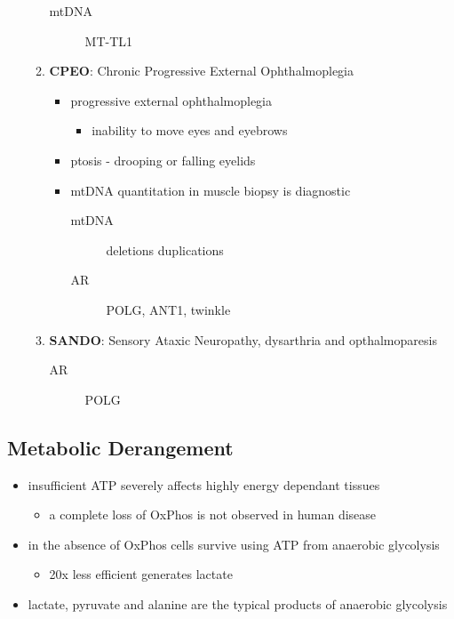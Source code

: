 \documentclass[12pt]{scrartcl}
\begin{document}
\begin{enumerate}
\begin{enumerate}
\label{sec:org7aaee90}
\begin{description}
\item[{mtDNA}] MT-TL1
\end{description}
\item \textbf{CPEO}: Chronic Progressive External Ophthalmoplegia
\label{sec:orga983291}
\begin{itemize}
\item progressive external ophthalmoplegia
\begin{itemize}
\item inability to move eyes and eyebrows
\end{itemize}
\item ptosis - drooping or falling eyelids
\item mtDNA quantitation in muscle biopsy is diagnostic
\begin{description}
\item[{mtDNA}] deletions \textpm{} duplications
\item[{AR}] POLG, ANT1, twinkle
\end{description}
\end{itemize}

\item \textbf{SANDO}: Sensory Ataxic Neuropathy, dysarthria and opthalmoparesis
\label{sec:orgbb9296c}
\begin{description}
\item[{AR}] POLG
\end{description}
\end{enumerate}
\end{enumerate}

\subsection{Metabolic Derangement}
\label{sec:orgb5ccb3c}
\begin{itemize}
\item insufficient ATP severely affects highly energy dependant tissues
\begin{itemize}
\item a complete loss of OxPhos is not observed in human disease
\end{itemize}
\item in the absence of OxPhos cells survive using ATP from anaerobic glycolysis
\begin{itemize}
\item 20x less efficient generates lactate
\end{itemize}
\item lactate, pyruvate and alanine are the typical products of anaerobic glycolysis
\end{itemize}
\end{document}
